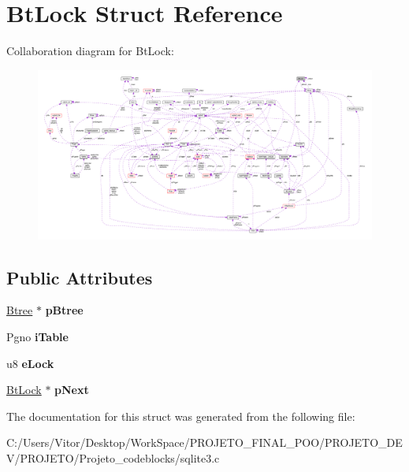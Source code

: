 \hypertarget{struct_bt_lock}{\section{Bt\-Lock Struct Reference}
\label{struct_bt_lock}
}


Collaboration diagram for Bt\-Lock\-:\nopagebreak
\begin{figure}[H]
\begin{center}
\leavevmode
\includegraphics[width=350pt]{struct_bt_lock__coll__graph}
\end{center}
\end{figure}
\subsection*{Public Attributes}
\begin{DoxyCompactItemize}
\item 
\hypertarget{struct_bt_lock_ab9125b8e79d480b75f3af21cb2ab55c7}{\hyperlink{struct_btree}{Btree} $\ast$ {\bfseries p\-Btree}}\label{struct_bt_lock_ab9125b8e79d480b75f3af21cb2ab55c7}

\item 
\hypertarget{struct_bt_lock_a822efcf018d6c8eb343341cde5df980d}{Pgno {\bfseries i\-Table}}\label{struct_bt_lock_a822efcf018d6c8eb343341cde5df980d}

\item 
\hypertarget{struct_bt_lock_abe07b71018ee423e0d94b5cdba044b5c}{u8 {\bfseries e\-Lock}}\label{struct_bt_lock_abe07b71018ee423e0d94b5cdba044b5c}

\item 
\hypertarget{struct_bt_lock_ad42de86209c7aab43604c52a549b7bca}{\hyperlink{struct_bt_lock}{Bt\-Lock} $\ast$ {\bfseries p\-Next}}\label{struct_bt_lock_ad42de86209c7aab43604c52a549b7bca}

\end{DoxyCompactItemize}


The documentation for this struct was generated from the following file\-:\begin{DoxyCompactItemize}
\item 
C\-:/\-Users/\-Vitor/\-Desktop/\-Work\-Space/\-P\-R\-O\-J\-E\-T\-O\-\_\-\-F\-I\-N\-A\-L\-\_\-\-P\-O\-O/\-P\-R\-O\-J\-E\-T\-O\-\_\-\-D\-E\-V/\-P\-R\-O\-J\-E\-T\-O/\-Projeto\-\_\-codeblocks/sqlite3.\-c\end{DoxyCompactItemize}
